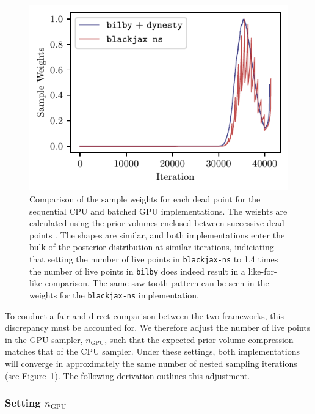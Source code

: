 \documentclass[fleqn,usenatbib]{mnras}
\providecommand{\DIFadd}[1]{{\protect\color{blue}\uwave{#1}}} %
\providecommand{\DIFaddFL}[1]{\DIFadd{#1}} %
\providecommand{\DIFaddbeginFL}{} %
\providecommand{\DIFaddendFL}{} %
\newcommand{\DIFaddincludegraphics}[2][]{{\color{blue}\fbox{\DIFOincludegraphics[#1]{#2}}}} %
\DeclareRobustCommand{\DIFaddbeginFL}{\DIFOaddbeginFL \let\includegraphics\DIFaddincludegraphics} %
\DeclareRobustCommand{\DIFaddendFL}{\DIFOaddendFL \let\includegraphics\DIFOincludegraphics} %
\begin{document}
\begin{figure}
    \centering
    \includegraphics{figures/weights_comparison.pdf}
    \caption{Comparison of the sample weights for each dead point for the sequential CPU and batched GPU implementations.
    The weights are calculated using the prior volumes enclosed between successive dead points \DIFaddbeginFL \DIFaddFL{and the likelihoods}\DIFaddendFL . 
    The shapes are similar, and both implementations enter the bulk of the posterior distribution at similar iterations,
    indiciating that setting the number of live points in \texttt{blackjax-ns} to 1.4 times the number of live points in \texttt{bilby} 
    does indeed result in a like-for-like comparison. The same saw-tooth pattern can be 
    seen in the weights for the \texttt{blackjax-ns} implementation.}
    \label{fig:weights_comparison}
\end{figure}

To conduct a fair and direct comparison between the two frameworks, this
discrepancy must be accounted for. We therefore adjust the number of
live points in the GPU sampler, $n_{\text{GPU}}$, such that the
expected prior volume compression matches that of the CPU sampler. 
Under these settings, both implementations will converge in
approximately the same number of nested sampling iterations (see Figure~\ref{fig:weights_comparison}). 
The following derivation outlines this adjustment.

\subsubsection{Setting $n_{\text{GPU}}$}
\label{sec:setting_n_gpu}
\end{document}
